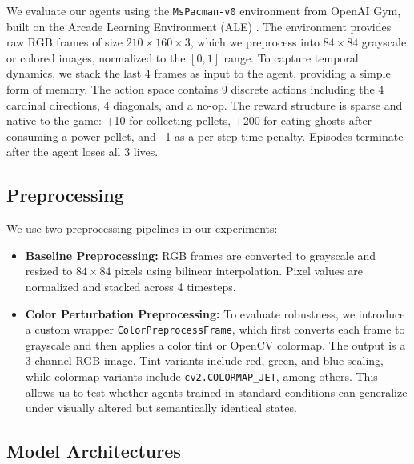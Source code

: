 \documentclass{article}
\begin{document}
We evaluate our agents using the \texttt{MsPacman-v0} environment from OpenAI Gym, built on the Arcade Learning Environment (ALE) \cite{ale}. The environment provides raw RGB frames of size $210 \times 160 \times 3$, which we preprocess into $84 \times 84$ grayscale or colored images, normalized to the $[0, 1]$ range. To capture temporal dynamics, we stack the last 4 frames as input to the agent, providing a simple form of memory. The action space contains 9 discrete actions including the 4 cardinal directions, 4 diagonals, and a no-op. The reward structure is sparse and native to the game: +10 for collecting pellets, +200 for eating ghosts after consuming a power pellet, and –1 as a per-step time penalty. Episodes terminate after the agent loses all 3 lives.

\subsection{Preprocessing}

We use two preprocessing pipelines in our experiments:

\begin{itemize}
    \item \textbf{Baseline Preprocessing:} RGB frames are converted to grayscale and resized to $84 \times 84$ pixels using bilinear interpolation. Pixel values are normalized and stacked across 4 timesteps.
    
    \item \textbf{Color Perturbation Preprocessing:} To evaluate robustness, we introduce a custom wrapper \texttt{ColorPreprocessFrame}, which first converts each frame to grayscale and then applies a color tint or OpenCV colormap. The output is a 3-channel RGB image. Tint variants include red, green, and blue scaling, while colormap variants include \texttt{cv2.COLORMAP\_JET}, among others. This allows us to test whether agents trained in standard conditions can generalize under visually altered but semantically identical states.
\end{itemize}

\subsection{Model Architectures}
\end{document}
